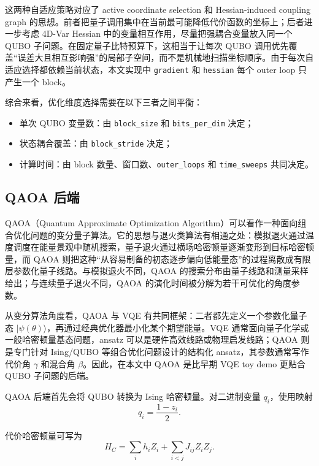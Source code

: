 \documentclass[UTF8,a4paper,12pt]{ctexart}
\begin{document}
这两种自适应策略对应了 active coordinate selection 和 Hessian-induced coupling graph 的思想。前者把量子调用集中在当前最可能降低代价函数的坐标上；后者进一步考虑 4D-Var Hessian 中的变量相互作用，尽量把强耦合变量放入同一个 QUBO 子问题。在固定量子比特预算下，这相当于让每次 QUBO 调用优先覆盖“误差大且相互影响强”的局部子空间，而不是机械地扫描坐标顺序。由于每次自适应选择都依赖当前状态，本文实现中 \texttt{gradient} 和 \texttt{hessian} 每个 outer loop 只产生一个 block。

综合来看，优化维度选择需要在以下三者之间平衡：
\begin{itemize}
  \item 单次 QUBO 变量数：由 \texttt{block\_size} 和 \texttt{bits\_per\_dim} 决定；
  \item 状态耦合覆盖：由 \texttt{block\_stride} 决定；
  \item 计算时间：由 block 数量、窗口数、\texttt{outer\_loops} 和 \texttt{time\_sweeps} 共同决定。
\end{itemize}

\subsection{QAOA 后端}

QAOA（Quantum Approximate Optimization Algorithm）可以看作一种面向组合优化问题的变分量子算法。它的思想与退火类算法有相通之处：模拟退火通过温度调度在能量景观中随机搜索，量子退火通过横场哈密顿量逐渐变形到目标哈密顿量，而 QAOA 则把这种“从容易制备的初态逐步偏向低能量态”的过程离散成有限层参数化量子线路。与模拟退火不同，QAOA 的搜索分布由量子线路和测量采样给出；与连续量子退火不同，QAOA 的演化时间被分解为若干可优化的角度参数。

从变分算法角度看，QAOA 与 VQE 有共同框架：二者都先定义一个参数化量子态 $|\psi(\theta)\rangle$，再通过经典优化器最小化某个期望能量。VQE 通常面向量子化学或一般哈密顿量基态问题，ansatz 可以是硬件高效线路或物理启发线路；QAOA 则是专门针对 Ising/QUBO 等组合优化问题设计的结构化 ansatz，其参数通常写作代价角 $\gamma$ 和混合角 $\beta$。因此，在本文中 QAOA 是比早期 VQE toy demo 更贴合 QUBO 子问题的后端。

QAOA 后端首先会将 QUBO 转换为 Ising 哈密顿量。对二进制变量 $q_i$，使用映射
\begin{equation}
  q_i = \frac{1 - z_i}{2}.
\end{equation}

代价哈密顿量可写为
\begin{equation}
  H_C
  =
  \sum_i h_i Z_i
  +
  \sum_{i<j} J_{ij} Z_i Z_j.
\end{equation}
\end{document}
